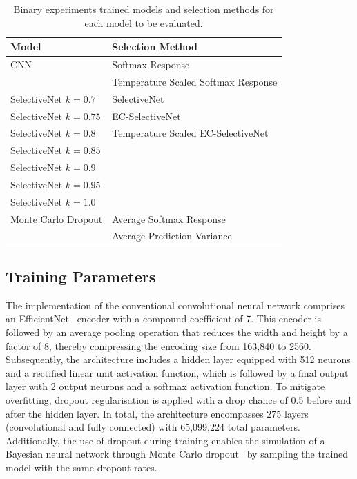 \begin{table}[h]
	\centering
	\caption{Binary experiments trained models and selection methods for each model to be evaluated.}
	\label{tab:binary-experiment-setup}
	\begin{tabular}{|l|l|}
		\hline
		Model & Selection Method \\ \hline
		CNN & Softmax Response \\
		& Temperature Scaled Softmax Response \\ \hline
		SelectiveNet $k=0.7$ & SelectiveNet \\
		SelectiveNet $k=0.75$ & EC-SelectiveNet \\
		SelectiveNet $k=0.8$ & Temperature Scaled EC-SelectiveNet \\
		SelectiveNet $k=0.85$ &  \\
		SelectiveNet $k=0.9$ &  \\
		SelectiveNet $k=0.95$ &  \\
		SelectiveNet $k=1.0$ &  \\ \hline
		Monte Carlo Dropout & Average Softmax Response \\
		& Average Prediction Variance \\ \hline
	\end{tabular}
\end{table}


\subsection{Training Parameters}
\label{subsec:selective_binary_training}
The implementation of the conventional convolutional neural network comprises an EfficientNet~\citep{tan2019efficient} encoder with a compound coefficient of 7. This encoder is followed by an average pooling operation that reduces the width and height by a factor of 8, thereby compressing the encoding size from 163,840 to 2560. Subsequently, the architecture includes a hidden layer equipped with 512 neurons and a rectified linear unit activation function, which is followed by a final output layer with 2 output neurons and a softmax activation function. To mitigate overfitting, dropout regularisation is applied with a drop chance of 0.5 before and after the hidden layer. In total, the architecture encompasses 275 layers (convolutional and fully connected) with 65,099,224 total parameters. Additionally, the use of dropout during training enables the simulation of a Bayesian neural network through Monte Carlo dropout~\citep{gal2016dropout} by sampling the trained model with the same dropout rates.

